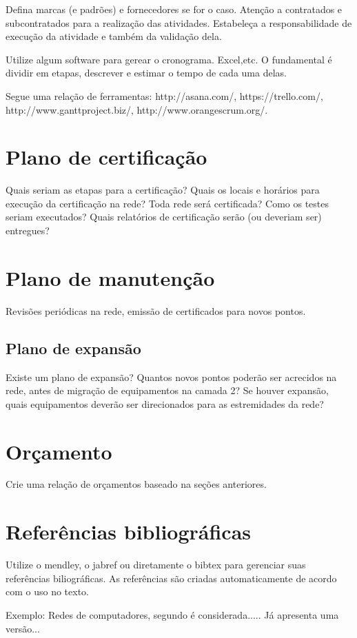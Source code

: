 \documentclass[	DIV=calc,%
							paper=a4,%
							fontsize=12pt,%
							onecolumn]{scrartcl}	 					%
\begin{document}
Defina marcas (e padrões) e fornecedores se for o caso. Atenção a contratados e subcontratados para a realização das atividades. Estabeleça a responsabilidade de execução da atividade e também da validação dela.

Utilize algum software para gerear o cronograma. Excel,etc. O fundamental é dividir em etapas, descrever e estimar o tempo de cada uma delas.

Segue uma relação de ferramentas:
http://asana.com/, 
https://trello.com/, 
http://www.ganttproject.biz/, 
http://www.orangescrum.org/. 

\section{Plano de certificação}
Quais seriam as etapas para a certificação? 
Quais os locais e horários para execução da certificação na rede? Toda rede será certificada?
Como os testes seriam executados?
Quais relatórios de certificação serão (ou deveriam ser) entregues? 

\section{Plano de manutenção}

Revisões periódicas na rede, emissão de certificados para novos pontos.

\subsection{Plano de expansão}
Existe um plano de expansão? Quantos novos pontos poderão ser acrecidos na rede, antes de migração de equipamentos na camada 2? Se houver expansão, quais equipamentos deverão ser direcionados para as estremidades da rede? 


\section{Orçamento}
Crie uma relação de orçamentos baseado na seções anteriores.

\section{Referências bibliográficas}
Utilize o mendley, o jabref ou diretamente o bibtex para gerenciar suas referências biliográficas. As referências são criadas automaticamente de acordo com o uso no texto.

Exemplo: Redes de computadores, segundo \cite{t2013} é considerada..... Já \cite{kurose2010} apresenta uma versão...
\end{document}

